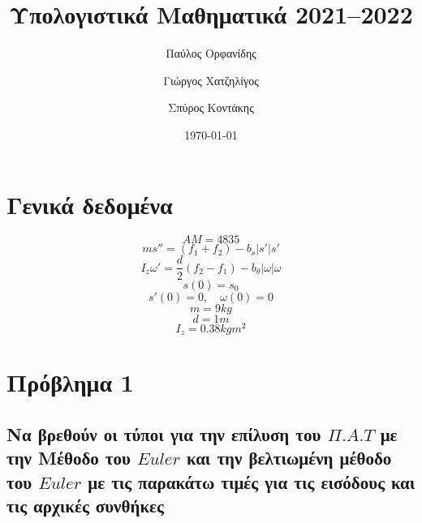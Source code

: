 \documentclass[a4paper]{article}
\author{Παύλος Ορφανίδης \and Γιώργος Χατζηλίγος \and Σπύρος Κοντάκης}
\date{\today}
\title{Υπολογιστικά Μαθηματικά 2021--2022}
\begin{document}
    \maketitle
    \tableofcontents


    \section*{Γενικά δεδομένα}
        \begin{equation}
            AM = 4835
        \end{equation}
        \begin{equation}
            ms'' = (f_1+f_2)-b_s\rvert s' \lvert s'
        \end{equation}
        \begin{equation}
            I_z\omega '=\frac{d}{2}(f_2-f_1)-b_{\theta}\rvert\omega\lvert\omega
        \end{equation}
        \begin{equation}
            s(0)=s_0
        \end{equation}
        \begin{equation}
            s'(0)=0,\quad \omega(0)=0
        \end{equation}
        \[m=9kg\]
        \[d=1m\]
        \[I_z=0.38 kgm^2\]
    \section{Πρόβλημα 1}
        \subsection{Nα βρεθούν οι τύποι για την επίλυση του $\Pi.A.T$ με την Mέθοδο του $Euler$ και την βελτιωμένη μέθοδο του $Euler$ με τις παρακάτω τιμές για τις εισόδους και τις αρχικές συνθήκες}
        
\end{document}
